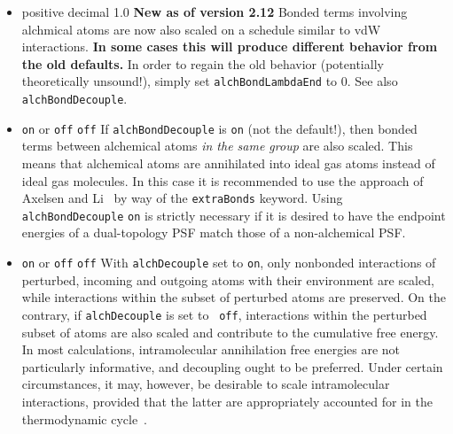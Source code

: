 \begin{itemize}
\item
{positive decimal}
{1.0}
{{\bf New as of version 2.12} Bonded terms involving alchmical atoms 
are now also scaled on a schedule similar to vdW interactions.  {\bf In some
cases this will produce different behavior from the old defaults.} In order to 
regain the old behavior (potentially theoretically unsound!), simply set 
{\tt alchBondLambdaEnd} to 0. See also {\tt alchBondDecouple}.
}

\item
{{\tt on} or {\tt off}}
{{\tt off}}
{If {\tt alchBondDecouple} is {\tt on} (not the default!), then bonded terms
between alchemical atoms \emph{in the same group} are also scaled.  This means 
that alchemical atoms are annihilated into ideal gas atoms instead of ideal gas
molecules.  In this case it is recommended to use the approach of Axelsen and
Li~\cite{Axelsen1998} by way of the {\tt extraBonds} keyword.  Using
{\tt alchBondDecouple} {\tt on} is strictly necessary if it is desired to have
the endpoint energies of a dual-topology PSF match those of a non-alchemical
PSF.
}


\item
{{\tt on} or {\tt off}} {{\tt off}} {With {\tt alchDecouple} set to {\tt on},
only nonbonded interactions of perturbed, incoming and outgoing atoms with
their environment are scaled, while interactions within the subset of perturbed
atoms are preserved. On the contrary, if {\tt alchDecouple} is set to {\tt
off}, interactions within the perturbed subset of atoms are also scaled and
contribute to the cumulative free energy. In most calculations, intramolecular
annihilation free energies are not particularly informative, and decoupling
ought to be preferred. Under certain circumstances, it may, however, be
desirable to scale intramolecular interactions, provided that the latter are
appropriately accounted for in the thermodynamic cycle~\cite{Chipot2007}. }


\end{itemize}
